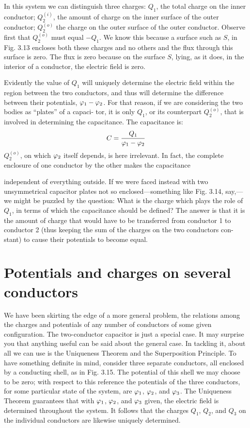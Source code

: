 In this system we can distinguish three charges: $Q_1$, the total
charge on the inner conductor; $Q_2^{(i)}$, the amount of charge on the
inner surface of the outer conductor; $Q_2^{(o)}$ the charge on the outer
surface of the outer conductor. Observe first that $Q_2^{(o)}$ must equal
$-Q_1$. We know this because a surface such as $S$, in Fig. 3.13 encloses
both these charges and no others and the flux through this
surface is zero. The flux is zero because on the surface $S$, lying, as
it does, in the interior of a conductor, the electric field is zero.

Evidently the value of $Q_1$ will uniquely determine the electric field
within the region between the two conductors, and thus will determine
the difference between their potentials, $\varphi_1-\varphi_2$. For that
reason, if we are considering the two bodies as ``plates'' of a capaci-
tor, it is only $Q_1$, or its counterpart $Q_2^{(o)}$, that is involved in determining
the capacitance. The capacitance is:
\begin{equation}
  C = \frac{Q_1}{\varphi_1-\varphi_2}
\end{equation}
$Q_2^{(o)}$, on which $\varphi_2$ itself depends, is here irrelevant. In fact, the complete
enclosure of one conductor by the other makes the capacitance

independent of everything outside. If we were faced instead with
two unsymmetrical capacitor plates not so enclosed---something like
Fig. 3.14, say,---we might be puzzled by the question: What is the
charge which plays the role of $Q_1$, in terms of which the capacitance
should be defined? The answer is that it is the amount of charge
that would have to be transferred from conductor 1 to conductor 2
(thus keeping the sum of the charges on the two conductors con-
stant) to cause their potentials to become equal.

\section{Potentials and charges on several conductors}

We have been skirting the edge of a more general problem, the
relations among the charges and potentials of any number of conductors
of some given configuration. The two-conductor capacitor
is just a special case. It may surprise you that anything useful can
be said about the general case. In tackling it, about all we can use
is the Uniqueness Theorem and the Superposition Principle. To
have something definite in mind, consider three separate conductors,
all enclosed by a conducting shell, as in Fig. 3.15. The potential of
this shell we may choose to be zero; with respect to this reference the
potentials of the three conductors, for some particular state of the
system, are $\varphi_1$, $\varphi_2$, and $\varphi_3$. The Uniqueness Theorem guarantees
that with $\varphi_1$, $\varphi_2$, and $\varphi_3$ given, the electric field is determined throughout
the system. It follows that the charges $Q_1$, $Q_2$, and $Q_3$ on the
individual conductors are likewise uniquely determined.

